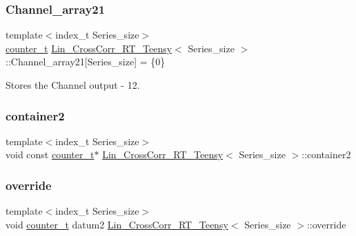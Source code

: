 \subsubsection{\texorpdfstring{Channel\+\_\+array21}{Channel\_array21}}
{\footnotesize\ttfamily template$<$index\+\_\+t Series\+\_\+size$>$ \\
\hyperlink{types_8hpp_ac89ac912f524b3e3fa3720ea55fec966}{counter\+\_\+t} \hyperlink{classLin__CrossCorr__RT__Teensy}{Lin\+\_\+\+Cross\+Corr\+\_\+\+R\+T\+\_\+\+Teensy}$<$ Series\+\_\+size $>$\+::Channel\+\_\+array21\mbox{[}Series\+\_\+size\mbox{]} = \{0\}}



Stores the Channel output -\/ 12. 

\mbox{\label{classLin__CrossCorr__RT__Teensy_a9c49e09d3817e1f1344c51928e3afb57}} 
\subsubsection{\texorpdfstring{container2}{container2}}
{\footnotesize\ttfamily template$<$index\+\_\+t Series\+\_\+size$>$ \\
void const \hyperlink{types_8hpp_ac89ac912f524b3e3fa3720ea55fec966}{counter\+\_\+t}$\ast$ \hyperlink{classLin__CrossCorr__RT__Teensy}{Lin\+\_\+\+Cross\+Corr\+\_\+\+R\+T\+\_\+\+Teensy}$<$ Series\+\_\+size $>$\+::container2}

\mbox{\label{classLin__CrossCorr__RT__Teensy_a5baab98aab70338799de9f82e7c7cc06}} 
\subsubsection{\texorpdfstring{override}{override}}
{\footnotesize\ttfamily template$<$index\+\_\+t Series\+\_\+size$>$ \\
void \hyperlink{types_8hpp_ac89ac912f524b3e3fa3720ea55fec966}{counter\+\_\+t} datum2 \hyperlink{classLin__CrossCorr__RT__Teensy}{Lin\+\_\+\+Cross\+Corr\+\_\+\+R\+T\+\_\+\+Teensy}$<$ Series\+\_\+size $>$\+::override}


